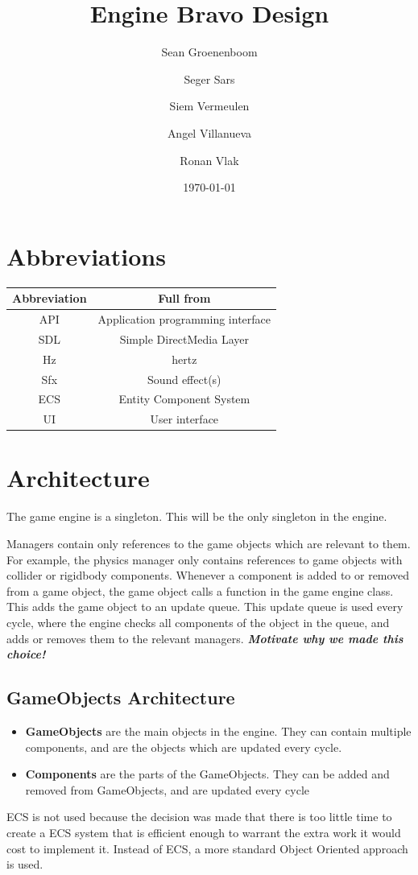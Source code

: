 \documentclass[draft]{article}
\title{Engine Bravo Design}
\author{Sean Groenenboom \and Seger Sars \and Siem Vermeulen \and Angel Villanueva \and Ronan Vlak} %
\date{\today}
\begin{document}
\maketitle %
\newpage

\tableofcontents
\newpage

\section{Abbreviations}
\begin{tabular}{c|c}
  \textbf{Abbreviation} & \textbf{Full from}                \\ \hline
  API                   & Application programming interface \\ \hline
  SDL                   & Simple DirectMedia Layer          \\ \hline
  Hz                    & hertz                             \\ \hline
  Sfx                   & Sound effect(s)                   \\ \hline
  ECS                   & Entity Component System           \\ \hline
  UI                    & User interface                    \\
\end{tabular}

\section{Architecture}
The game engine is a singleton. This will be the only singleton in the engine.

Managers contain only references to the game objects which are relevant to them. For example, the physics manager only contains references to game objects with collider or rigidbody components.
Whenever a component is added to or removed from a game object, the game object calls a function in the game engine class. This adds the game object to an update queue. This update queue is used every cycle, where the engine checks all components of the object in the queue, and adds or removes them to the relevant managers.
\textbf{\textit{Motivate why we made this choice!}}

\subsection{GameObjects Architecture}
\begin{itemize}
  \item \textbf{GameObjects} are the main objects in the engine. They can contain multiple components, and are the objects which are updated every cycle.
  \item \textbf{Components} are the parts of the GameObjects. They can be added and removed from GameObjects, and are updated every cycle
\end{itemize}
ECS is not used because the decision was made that there is too little time to create a ECS system that is efficient enough to warrant the extra work it would cost to implement it.
Instead of ECS, a more standard Object Oriented approach is used.
\end{document}
